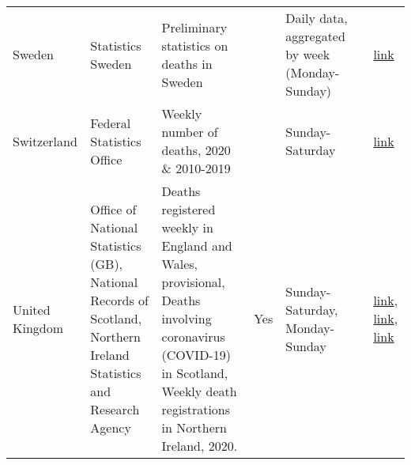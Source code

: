 \documentclass[
]{article}
\begin{document}
\begin{landscape}
\begin{table}[]
\begin{tabular}{p{.5in}p{1.5in}p{2in}p{1in}p{1.5in}p{1in}p{.5in}}
Sweden           & Statistics Sweden                                                                                                                                                    & Preliminary statistics on deaths in Sweden                                                                                                                                 &                   & Daily data, aggregated by week (Monday-Sunday) &                                                                          & \href{https://www.scb.se/en/About-us/news-and-press-releases/statistics-sweden-to-publish-preliminary-statistics-on-deaths-in-sweden/}{link}                                                                                                                                                                                               \\
Switzerland      & Federal Statistics Office                                                                                                                                            & Weekly number of deaths, 2020 \& 2010-2019                                                                                                                                 &                   & Sunday-Saturday                                          &                                                                          & \href{https://www.bfs.admin.ch/bfs/en/home/statistics/health/state-health/mortality-causes-death.html}{link}                                                                                                                                                                                                                               \\
United Kingdom   & Office of National Statistics (GB), National Records of Scotland, Northern Ireland Statistics and Research Agency & Deaths registered weekly in England and Wales, provisional, Deaths involving coronavirus (COVID-19) in Scotland, Weekly death registrations in Northern Ireland, 2020. & Yes & Sunday-Saturday, Monday-Sunday                                          &                                                                          &  \href{https://www.ons.gov.uk/peoplepopulationandcommunity/birthsdeathsandmarriages/deaths/datasets/weeklyprovisionalfiguresondeathsregisteredinenglandandwales}{link},   \href{https://www.nrscotland.gov.uk/covid19stats}{link},   \href{https://www.nisra.gov.uk/publications/weekly-deaths}{link} \\

\end{tabular}
\end{table}
\end{landscape}
\end{document}
